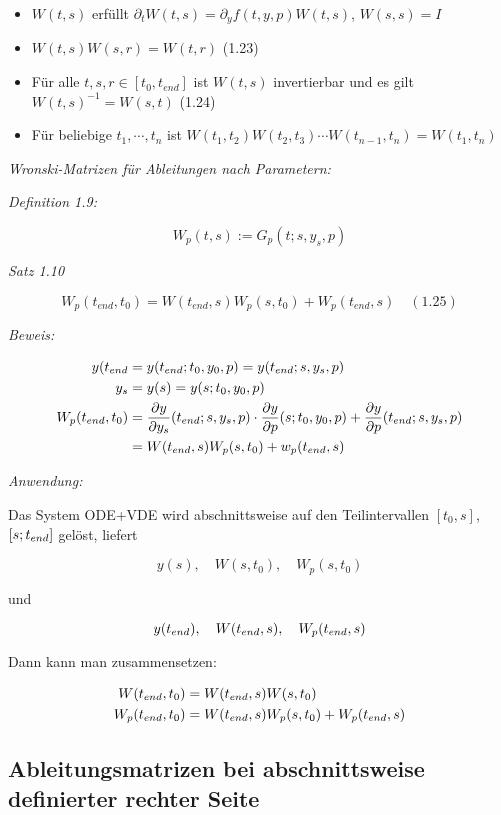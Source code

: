 \begin{itemize}
\item $W(t,s)$ erfüllt $\partial_t W(t,s) = \partial_y f(t,y,p) W(t,s)$, $W(s,s) = I$ 
\item $W(t,s) W(s,r) = W(t,r)$ (1.23)
\item Für alle $t,s,r \in [t_0, t_{end}]$ ist $W(t,s)$ invertierbar und es gilt $W(t,s)^{-1} = W(s,t)$ (1.24)
\item Für beliebige $t_1,\cdots,t_n$ ist $W(t_1,t_2)W(t_2,t_3) \cdots W(t_{n-1}, t_n) = W(t_1, t_n)$
\end{itemize}

\emph{Wronski-Matrizen für Ableitungen nach Parametern:}

\emph{Definition 1.9:}

\[ W_p(t,s) := G_p(t;s,y_s,p)\]

\emph{Satz 1.10}

\[ W_p(t_{end},t_0) = W(t_{end},s) W_p(s,t_0)+W_p(t_{end},s) \quad (1.25) \]

\emph{Beweis:}

\begin{align*}
y(t_{end} &= y(t_{end}; t_0, y_0, p) = y(t_{end};s,y_s,p) \\
y_s &= y(s) = y(s; t_0,y_0,p) \\
W_p(t_{end},t_0) &= \frac{\partial y}{\partial y_s}(t_{end}; s,y_s,p) \cdot \frac{\partial y}{\partial p} (s;t_0,y_0,p) +\frac{\partial y}{\partial p}(t_{end}; s,y_s,p)\\
&= W(t_{end},s) W_p(s,t_0) + w_p(t_{end},s)
\end{align*}

\emph{Anwendung:}

Das System ODE+VDE wird abschnittsweise auf den Teilintervallen $[t_0,s]$, $[s;t_{end}]$ gelöst, liefert

\[y(s),\quad W(s,t_0), \quad W_p(s,t_0) \]

und

\[ y(t_{end}), \quad W(t_{end},s), \quad W_p(t_{end},s)\]

Dann kann man zusammensetzen:

\begin{align*}
W(t_{end},t_0) &= W(t_{end}, s) W(s,t_0) \\
W_p(t_{end},t_0) &= W(t_{end}, s) W_p(s,t_0) + W_p(t_{end}, s) 
\end{align*}

\subsection*{Ableitungsmatrizen bei abschnittsweise definierter rechter Seite}

